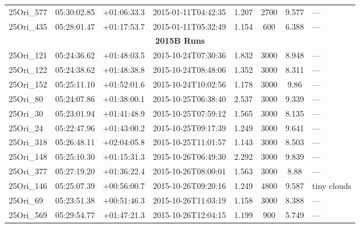 \documentclass[12pt]{article}
\begin{document}
\begin{table}[ht!]
\begin{center}
\begin{threeparttable}
\begin{tabular}{lccccccl}
	25Ori\_577    & 05:30:02.85 & +01:06:33.3 & 2015-01-11T04:42:35  & 1.207         & 2700             & 9.577  & ---                      \\
	25Ori\_435    & 05:28:01.47 & +01:17:53.7 & 2015-01-11T05:32:49  & 1.154         & 600              & 6.388  & ---                      \\
	\multicolumn{8}{c}{{\bf 2015B Runs}} \\
	25Ori\_121    & 05:24:36.62 & +01:48:03.5 & 2015-10-24T07:30:36  & 1.832         & 3000             & 8.948  & ---                      \\
	25Ori\_122    & 05:24:38.62 & +01:48:38.8 & 2015-10-24T08:48:06  & 1.352         & 3000             & 8.311  & ---                      \\
	25Ori\_152    & 05:25:11.10 & +01:52:01.6 & 2015-10-24T10:02:56  & 1.178         & 3000             & 9.86   & ---                      \\
	25Ori\_80     & 05:24:07.86 & +01:38:00.1 & 2015-10-25T06:38:40  & 2.537         & 3000             & 9.339  & ---                      \\
	25Ori\_30     & 05:23:01.94 & +01:41:48.9 & 2015-10-25T07:59:12  & 1.565         & 3000             & 8.135  & ---                      \\
	25Ori\_24     & 05:22:47.96 & +01:43:00.2 & 2015-10-25T09:17:39  & 1.249         & 3000             & 9.641  & ---                      \\
	25Ori\_318    & 05:26:48.11 & +02:04:05.8 & 2015-10-25T11:01:57  & 1.143         & 3000             & 8.503  & ---                      \\
	25Ori\_148    & 05:25:10.30 & +01:15:31.3 & 2015-10-26T06:49:30  & 2.292         & 3000             & 9.839  & ---                      \\
	25Ori\_377    & 05:27:19.20 & +01:36:22.4 & 2015-10-26T08:00:01  & 1.563         & 3000             & 8.88   & ---                      \\
	25Ori\_146    & 05:25:07.39 & +00:56:00.7 & 2015-10-26T09:20:16  & 1.249         & 4800             & 9.587  & tiny clouds              \\
	25Ori\_69     & 05:23:51.38 & +00:51:46.3 & 2015-10-26T11:03:19  & 1.158         & 3000             & 8.388  & ---                      \\
	25Ori\_569    & 05:29:54.77 & +01:47:21.3 & 2015-10-26T12:04:15  & 1.199         & 900              & 5.749  & ---                      \\

\end{tabular}
\end{threeparttable}
\end{center}
\end{table}
\end{document}
